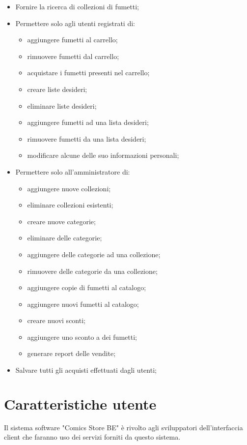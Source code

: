 \documentclass{scrreprt}
\begin{document}
\begin{itemize}
    \item Fornire la ricerca di collezioni di fumetti;
    \item Permettere solo agli utenti registrati di:
        \begin{itemize}
            \item aggiungere fumetti al carrello;
            \item rimuovere fumetti dal carrello;
            \item acquistare i fumetti presenti nel carrello;
            \item creare liste desideri;
            \item eliminare liste desideri;
            \item aggiungere fumetti ad una lista desideri;
            \item rimuovere fumetti da una lista desideri;
            \item modificare alcune delle suo informazioni personali;
        \end{itemize}
    \item Permettere solo all'amministratore di:
        \begin{itemize}
            \item aggiungere nuove collezioni;
            \item eliminare collezioni esistenti;
            \item creare nuove categorie;
            \item eliminare delle categorie;
            \item aggiungere delle categorie ad una collezione;
            \item rimuovere delle categorie da una collezione;
            \item aggiungere copie di fumetti al catalogo;
            \item aggiungere nuovi fumetti al catalogo;
            \item creare nuovi sconti;
            \item aggiungere uno sconto a dei fumetti;
            \item generare report delle vendite;
        \end{itemize}
    \item Salvare tutti gli acquisti effettuati dagli utenti;
\end{itemize}

\section{Caratteristiche utente}
Il sistema software "Comics Store BE" è rivolto agli sviluppatori dell'interfaccia client che faranno
uso dei servizi forniti da questo sistema.
\end{document}
